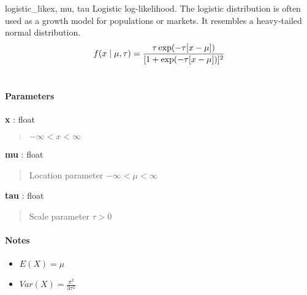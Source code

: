 \hypertarget{pymc.distributions.logistic_like}{}
\begin{funcdesc}{logistic\_like}{x, mu, tau}
Logistic log-likelihood. The logistic distribution is often used as a growth model for populations or markets. It resembles a heavy-tailed normal distribution.
\begin{gather}
\begin{split}f(x \mid \mu, \tau) = \frac{\tau \exp(-\tau[x-\mu])}{[1 + \exp(-\tau[x-\mu])]^2}\end{split}\notag\\\begin{split}\end{split}\notag
\end{gather}\paragraph{Parameters}\begin{paramlist}

\item[] \textbf{x} : float
\begin{quote}

$-\infty < x < \infty$
\end{quote}

\item[] \textbf{mu} : float
\begin{quote}

Location parameter $-\infty < \mu < \infty$
\end{quote}

\item[] \textbf{tau} : float
\begin{quote}

Scale parameter $\tau > 0$
\end{quote}
\end{paramlist}
\paragraph{Notes}
\begin{itemize}
\item {} 
$E(X) = \mu$

\item {} 
$Var(X) = \frac{\pi^2}{3\tau^2}$

\end{itemize}
\end{funcdesc}

